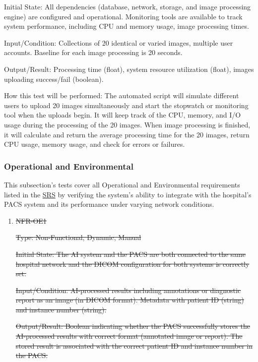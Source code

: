\documentclass[12pt, titlepage]{article}
\begin{document}
\begin{enumerate}
\begin{enumerate}
\begin{enumerate}
\begin{enumerate}
Initial State: All dependencies (database, network, storage, and image processing engine) are configured and operational. Monitoring tools are available to track system performance, including CPU and memory usage, image processing times.

Input/Condition: Collections of 20 identical or varied images, multiple user accounts. Baseline for each image processing is 20 seconds.

Output/Result: Processing time (float), system resource utilization (float), images uploading success/fail (boolean).

How this test will be performed: The automated script will simulate different users to upload 20 images simultaneously and start the stopwatch or monitoring tool when the uploads begin. It will keep track of the CPU, memory, and I/O usage during the processing of the 20 images. When image processing is finished, it will calculate and return the average processing time for the 20 images, return CPU usage, memory usage, and check for errors or failures.

\end{enumerate}

\subsubsection{Operational and Environmental}

This subsection's tests cover all Operational and Environmental requirements listed in the \href{https://github.com/RezaJodeiri/CXR-Capstone/blob/main/docs/SRS/SRS.pdf}{SRS} \citep{SRS}
 by verifying the system's ability to integrate with the hospital's PACS system and its performance under varying network conditions.

\begin{enumerate}

\item{\sout{NFR-OE1}\\}\label{NFR-OE1}

\sout{Type: Non-Functional, Dynamic, Manual}

\sout{Initial State: The AI system and the PACS are both connected to the same hospital network and the DICOM configuration for both systems is correctly set.}

\sout{Input/Condition: AI-processed results including annotations or diagnostic report as an image (in DICOM format). Metadata with patient ID (string) and instance number (string).}

\sout{Output/Result: Boolean indicating whether the PACS successfully stores the AI-processed results with correct format (annotated image or report). The stored result is associated with the correct patient ID and instance number in the PACS.}


\end{enumerate}
\end{enumerate}
\end{enumerate}
\end{enumerate}
\end{document}
